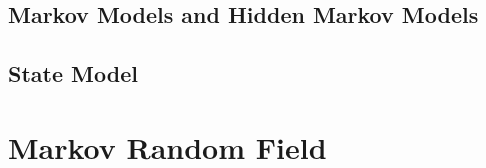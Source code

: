 \section{Markov Models and Hidden Markov Models}


\section{State Model}


\chapter{Markov Random Field}

